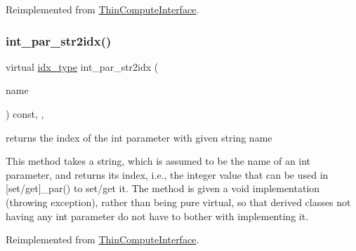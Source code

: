 Reimplemented from \mbox{\hyperlink{class_s_m_spp__di__unipi__it_1_1_thin_compute_interface_a3d3d1ca3218d2d640614ed75a960ef01}{Thin\+Compute\+Interface}}.

\mbox{\label{class_s_m_spp__di__unipi__it_1_1_f_real_objective_ae281b6699b0707a5cdc1e82b76d26c09}} 
\subsubsection{\texorpdfstring{int\+\_\+par\+\_\+str2idx()}{int\_par\_str2idx()}}
{\footnotesize\ttfamily virtual \mbox{\hyperlink{class_s_m_spp__di__unipi__it_1_1_thin_compute_interface_aa3d710629ad8c434286726ad810c3b47}{idx\+\_\+type}} int\+\_\+par\+\_\+str2idx (\begin{DoxyParamCaption}\item[{const std\+::string \&}]{name }\end{DoxyParamCaption}) const\hspace{0.3cm}{\ttfamily [inline]}, {\ttfamily [override]}, {\ttfamily [virtual]}}



returns the index of the int parameter with given string name 

This method takes a string, which is assumed to be the name of an int parameter, and returns its index, i.\+e., the integer value that can be used in \mbox{[}set/get\mbox{]}\+\_\+par() to set/get it. The method is given a void implementation (throwing exception), rather than being pure virtual, so that derived classes not having any int parameter do not have to bother with implementing it. 

Reimplemented from \mbox{\hyperlink{class_s_m_spp__di__unipi__it_1_1_thin_compute_interface_a69c6857c4288135135e8b6bbcf24252a}{Thin\+Compute\+Interface}}.

\mbox{\label{class_s_m_spp__di__unipi__it_1_1_f_real_objective_ae2efd3cdf1d4fd41cbafda3c49facfa5}} 
